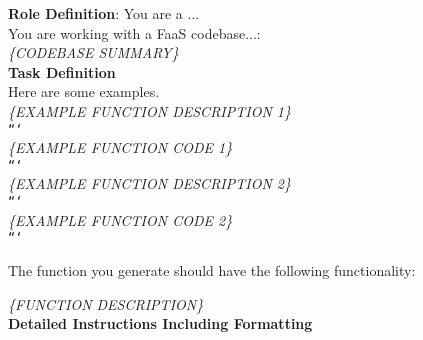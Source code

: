 \begin{tcolorbox}[colback=orange!5!white, colframe=orange!95!white, colbacktitle=orange!95!white, title=Few Shot with Codebase Summarization]
\small
    \textbf{Role Definition}: You are a ...\\
    You are working with a FaaS codebase...:\\
    \textit{\{CODEBASE SUMMARY\}}\\

    \textbf{Task Definition}\\
    Here are some examples. \\
    \textit{\{EXAMPLE FUNCTION DESCRIPTION 1\}}\\
    \texttt{```}\\
    \textit{\{EXAMPLE FUNCTION CODE 1\}}\\
    \texttt{```}\\
    \textit{\{EXAMPLE FUNCTION DESCRIPTION 2\}}\\
    \texttt{```}\\
    \textit{\{EXAMPLE FUNCTION CODE 2\}}\\
    \texttt{```}

    \tcblower
\small
    The function you generate should have the following functionality:
    
    \textit{\{FUNCTION DESCRIPTION\}}\\
    \textbf{Detailed Instructions Including Formatting}
\normalsize
\end{tcolorbox}
\begin{minipage}{\linewidth}
\label{box:type3}
\end{minipage}